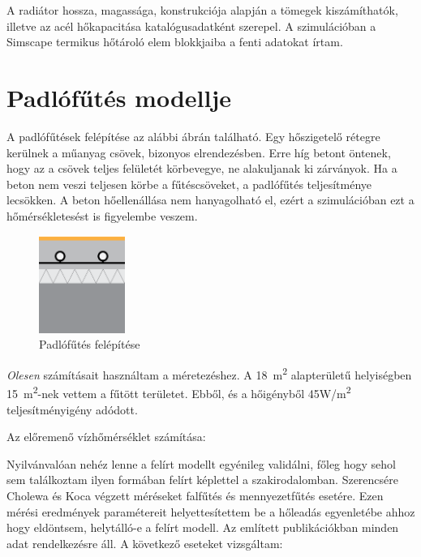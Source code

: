 
A radiátor hossza, magassága, konstrukciója alapján a tömegek kiszámíthatók, illetve az acél hőkapacitása katalógusadatként szerepel.
A szimulációban a  Simscape termikus hőtároló elem blokkjaiba a fenti adatokat írtam.%


\section{Padlófűtés modellje}

A padlófűtések felépítése az alábbi ábrán található. Egy hőszigetelő rétegre kerülnek a műanyag csövek, bizonyos elrendezésben. Erre híg betont öntenek, hogy az a csövek teljes felületét körbevegye, ne alakuljanak ki zárványok. Ha a beton nem veszi teljesen körbe a fűtéscsöveket, a padlófűtés teljesítménye lecsökken. A beton hőellenállása nem hanyagolható el, ezért a szimulációban ezt a hőmérsékletesést is figyelembe veszem.

\begin{figure}[H]
	\centering
	\includegraphics[trim=0 0 0 0, clip,width=0.25\textwidth]{figures/ISO11855typeA}
	\caption{Padlófűtés felépítése}
	\label{fig:futotest-padlofutes}
\end{figure}

\textit{Olesen} számításait használtam a méretezéshez.
A \SI{18}{\metre\squared} alapterületű helyiségben \SI{15}{\metre\squared}-nek vettem a fűtött területet. Ebből, és a hőigényből 45\si[per-mode=symbol]{\watt\per\metre\squared} teljesítményigény adódott.

Az előremenő vízhőmérséklet számítása:

Nyilvánvalóan nehéz lenne a felírt modellt egyénileg validálni, főleg hogy sehol sem találkoztam ilyen formában felírt képlettel a szakirodalomban. Szerencsére Cholewa \cite{CHOLEWA2013599} és Koca \cite{Koca} végzett méréseket falfűtés és mennyezetfűtés esetére. Ezen mérési eredmények paramétereit helyettesítettem be a hőleadás egyenletébe ahhoz hogy eldöntsem, helytálló-e a felírt modell. Az említett publikációkban minden adat rendelkezésre áll. A következő eseteket vizsgáltam:

